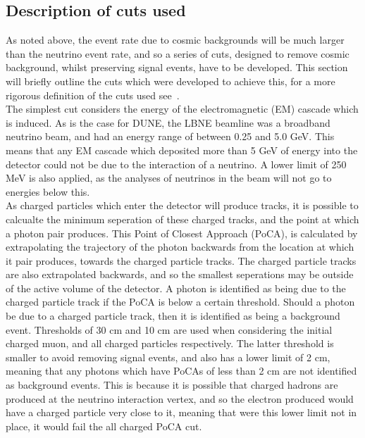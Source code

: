 \subsection{Description of cuts used} \label{sec:SurfCutList}
As noted above, the event rate due to cosmic backgrounds will be much larger than the neutrino event rate, and so a series of cuts, designed to remove cosmic background, whilst preserving signal events, have to be developed. This section will briefly outline the cuts which were developed to achieve this, for a more rigorous definition of the cuts used see~\citep{MartinsThesis}. \\

The simplest cut considers the energy of the electromagnetic (EM) cascade which is induced. As is the case for DUNE, the LBNE beamline was a broadband neutrino beam, and had an energy range of between 0.25 and 5.0 GeV. This means that any EM cascade which deposited more than 5 GeV of energy into the detector could not be due to the interaction of a neutrino. A lower limit of 250 MeV is also applied, as the analyses of neutrinos in the beam will not go to energies below this. \\

As charged particles which enter the detector will produce tracks, it is possible to calcualte the minimum seperation of these charged tracks, and the point at which a photon pair produces. This Point of Closest Approach (PoCA), is calculated by extrapolating the trajectory of the photon backwards from the location at which it pair produces, towards the charged particle tracks. The charged particle tracks are also extrapolated backwards, and so the smallest seperations may be outside of the active volume of the detector. A photon is identified as being due to the charged particle track if the PoCA is below a certain threshold. Should a photon be due to a charged particle track, then it is identified as being a background event. Thresholds of 30 cm and 10 cm are used when considering the initial charged muon, and all charged particles respectively. The latter threshold is smaller to avoid removing signal events, and also has a lower limit of 2 cm, meaning that any photons which have PoCAs of less than 2 cm are not identified as background events. This is because it is possible that charged hadrons are produced at the neutrino interaction vertex, and so the electron produced would have a charged particle very close to it, meaning that were this lower limit not in place, it would fail the all charged PoCA cut. \\ 

